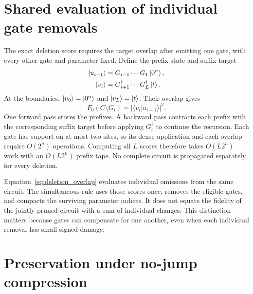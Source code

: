 \section{Shared evaluation of individual gate removals}
\label{app:deletion}

The exact deletion score requires the target overlap after omitting one gate, with every other gate and parameter fixed. Define the prefix state and suffix target
\begin{align}
    \ket{u_{i-1}}&=G_{i-1}\cdots G_1\ket{0^n},\\
    \ket{v_i}&=G_{i+1}^\dagger\cdots G_L^\dagger\ket{t}.
\end{align}
At the boundaries, $\ket{u_0}=\ket{0^n}$ and $\ket{v_L}=\ket{t}$. Their overlap gives
\begin{equation}
    F_0(C\setminus G_i)=|\langle v_i|u_{i-1}\rangle|^2.
    \label{eq:deletion_overlap}
\end{equation}
One forward pass stores the prefixes. A backward pass contracts each prefix with the corresponding suffix target before applying $G_i^\dagger$ to continue the recursion. Each gate has support on at most two sites, so its dense application and each overlap require $O(2^n)$ operations. Computing all $L$ scores therefore takes $O(L2^n)$ work with an $O(L2^n)$ prefix tape. No complete circuit is propagated separately for every deletion.

Equation~\eqref{eq:deletion_overlap} evaluates individual omissions from the same circuit. The simultaneous rule uses those scores once, removes the eligible gates, and compacts the surviving parameter indices. It does not equate the fidelity of the jointly pruned circuit with a sum of individual changes. This distinction matters because gates can compensate for one another, even when each individual removal has small signed damage.

\section{Preservation under no-jump compression}
\label{app:compression}

